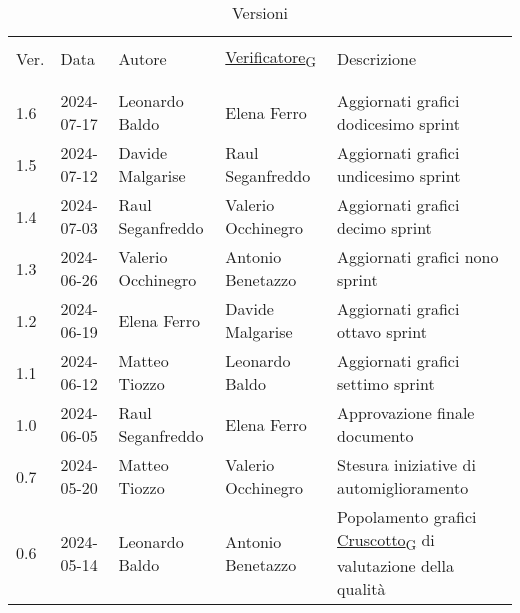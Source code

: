 \documentclass[italian,12pt]{article} %
\begin{document}

\newpage

\captionsetup[table]{list=no}
\begin{table}[!h]
	\caption*{Versioni}
	\footnotesize
	\begin{center}
		\begin{tabular}{ l l l l p{6cm} }
			\hline                                                                                                                   \\[-2ex]
			Ver. & Data       & Autore             & \href{https://7last.github.io/docs/pb/documentazione-interna/glossario\#verificatore}{Verificatore\textsubscript{G}}       & Descrizione                                                \\
			\\[-2ex] \hline \\[-1.5ex]
			1.6  & 2024-07-17 & Leonardo Baldo     & Elena Ferro        & Aggiornati grafici dodicesimo sprint \\
			1.5  & 2024-07-12 & Davide Malgarise   & Raul Seganfreddo   & Aggiornati grafici undicesimo sprint \\
			1.4  & 2024-07-03 & Raul Seganfreddo   & Valerio Occhinegro & Aggiornati grafici decimo sprint \\
			1.3  & 2024-06-26 & Valerio Occhinegro & Antonio Benetazzo  & Aggiornati grafici nono sprint \\
			1.2  & 2024-06-19 & Elena Ferro        & Davide Malgarise   & Aggiornati grafici ottavo sprint \\
			1.1  & 2024-06-12 & Matteo Tiozzo      & Leonardo Baldo     & Aggiornati grafici settimo sprint \\
			1.0  & 2024-06-05 & Raul Seganfreddo   & Elena Ferro        & Approvazione finale documento                              \\
			0.7  & 2024-05-20 & Matteo Tiozzo      & Valerio Occhinegro & Stesura iniziative di automiglioramento                    \\
			0.6  & 2024-05-14 & Leonardo Baldo     & Antonio Benetazzo  & Popolamento grafici \href{https://7last.github.io/docs/pb/documentazione-interna/glossario\#cruscotto}{Cruscotto\textsubscript{G}} di valutazione della qualità \\

\end{tabular}
\end{center}
\end{table}
\end{document}
